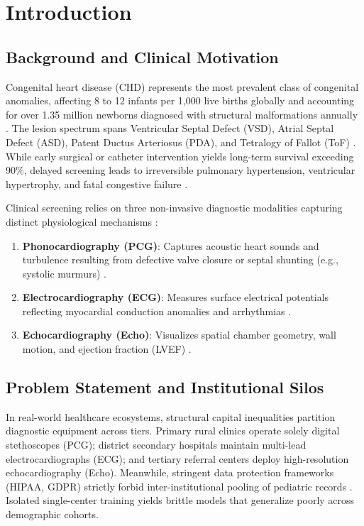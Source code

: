 \documentclass[conference]{IEEEtran}
\begin{document}
\section{Introduction}

\subsection{Background and Clinical Motivation}
Congenital heart disease (CHD) represents the most prevalent class of congenital anomalies, affecting 8 to 12 infants per 1,000 live births globally and accounting for over 1.35 million newborns diagnosed with structural malformations annually \cite{liu2019global, hoffman2002incidence}. The lesion spectrum spans Ventricular Septal Defect (VSD), Atrial Septal Defect (ASD), Patent Ductus Arteriosus (PDA), and Tetralogy of Fallot (ToF) \cite{minette2006ventricular, bouma2017changing}. While early surgical or catheter intervention yields long-term survival exceeding 90\%, delayed screening leads to irreversible pulmonary hypertension, ventricular hypertrophy, and fatal congestive failure \cite{zimmerman2020global}.

Clinical screening relies on three non-invasive diagnostic modalities capturing distinct physiological mechanisms \cite{garcia2013comparison}:
\begin{enumerate}
    \item \textbf{Phonocardiography (PCG)}: Captures acoustic heart sounds and turbulence resulting from defective valve closure or septal shunting (e.g., systolic murmurs) \cite{leng2015phonocardiogram}.
    \item \textbf{Electrocardiography (ECG)}: Measures surface electrical potentials reflecting myocardial conduction anomalies and arrhythmias \cite{ribeiro2020automatic}.
    \item \textbf{Echocardiography (Echo)}: Visualizes spatial chamber geometry, wall motion, and ejection fraction (LVEF) \cite{ouyang2020video}.
\end{enumerate}

\subsection{Problem Statement and Institutional Silos}
In real-world healthcare ecosystems, structural capital inequalities partition diagnostic equipment across tiers. Primary rural clinics operate solely digital stethoscopes (PCG); district secondary hospitals maintain multi-lead electrocardiographs (ECG); and tertiary referral centers deploy high-resolution echocardiography (Echo). Meanwhile, stringent data protection frameworks (HIPAA, GDPR) strictly forbid inter-institutional pooling of pediatric records \cite{kaissis2020secure}. Isolated single-center training yields brittle models that generalize poorly across demographic cohorts.
\end{document}
